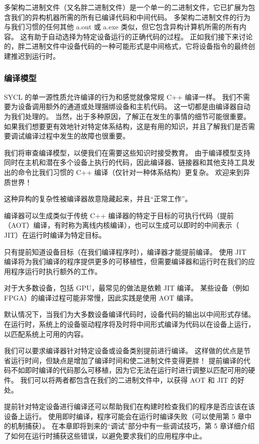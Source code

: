 多架构二进制文件（又名胖二进制文件）是一个单一的二进制文件，它已扩展为包含我们的异构机器所需的所有已编译代码和中间代码。 多架构二进制文件的行为与我们习惯的任何其他 a.out 或 a.exe 类似，但它包含异构计算机所需的所有内容。 这有助于自动选择为特定设备运行的正确代码的过程。 正如我们接下来讨论的，胖二进制文件中设备代码的一种可能形式是中间格式，它将设备指令的最终创建推迟到运行时。

\subsubsection{编译模型}
SYCL 的单一源性质允许编译的行为和感觉就像常规 C++ 编译一样。 我们不需要为设备调用额外的通道或处理捆绑设备和主机代码。 这一切都是由编译器自动为我们处理的。 当然，出于多种原因，了解正在发生的事情的细节可能很重要。 如果我们想要更有效地针对特定体系结构，这是有用的知识，并且了解我们是否需要调试编译过程中发生的故障也很重要。

我们将审查编译模型，以便我们在需要这些知识时接受教育。 由于编译模型支持同时在主机和潜在多个设备上执行的代码，因此编译器、链接器和其他支持工具发出的命令比我们习惯的 C++ 编译（仅针对一种体系结构）更复杂。 欢迎来到异质世界！

这种异构的复杂性被编译器故意隐藏起来，并且“正常工作”。

编译器可以生成类似于传统 C++ 编译器的特定于目标的可执行代码（提前（AOT）编译，有时称为离线内核编译），也可以生成可以即时的中间表示（ JIT）在运行时编译为特定目标。

只有提前知道设备目标（在我们编译程序时），编译器才能提前编译。 使用 JIT 编译将为我们编译的程序提供更多的可移植性，但需要编译器和运行时在我们的应用程序运行时执行额外的工作。

对于大多数设备，包括 GPU，最常见的做法是依赖 JIT 编译。 某些设备（例如 FPGA）的编译过程可能非常慢，因此实践是使用 AOT 编译。

默认情况下，当我们为大多数设备编译代码时，设备代码的输出以中间形式存储。 在运行时，系统上的设备驱动程序将及时将中间形式编译为代码以在设备上运行，以匹配系统上可用的内容。

我们可以要求编译器针对特定设备或设备类别提前进行编译。 这样做的优点是节省运行时间，但缺点是增加了编译时间和使二进制文件变得更胖！ 提前编译的代码不如即时编译的代码那么可移植，因为它无法在运行时进行调整以匹配可用的硬件。 我们可以将两者都包含在我们的二进制文件中，以获得 AOT 和 JIT 的好处。

提前针对特定设备进行编译还可以帮助我们在构建时检查我们的程序是否应该在该设备上运行。 使用即时编译，程序可能会在运行时编译失败（可以使用第 5 章中的机制捕获）。 在本章即将到来的“调试”部分中有一些调试技巧，第 5 章详细介绍了如何在运行时捕获这些错误，以避免要求我们的应用程序中止。

